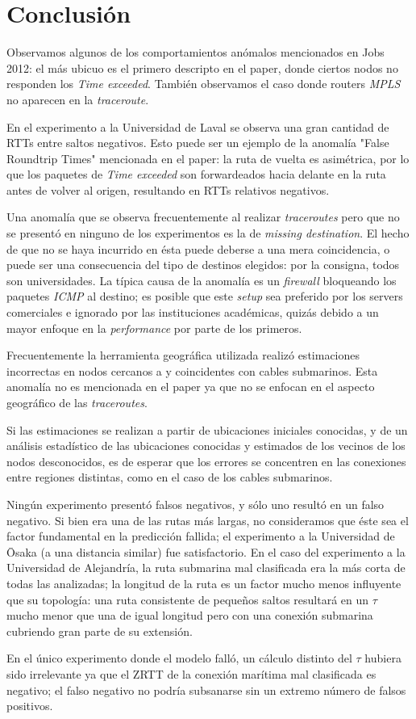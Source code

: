 \section{Conclusión}

\PARstart Observamos algunos de los comportamientos anómalos mencionados en Jobs 2012\cite{anomalias}: el más ubicuo es el primero descripto en el paper, donde ciertos nodos no responden los \textit{Time exceeded}. 
También observamos el caso donde routers \textit{MPLS} no aparecen en la \textit{traceroute}.

\par En el experimento a la Universidad de Laval se observa una gran cantidad de RTTs entre saltos negativos.
Esto puede ser un ejemplo de la anomalía "False Roundtrip Times" mencionada en el paper: la ruta de vuelta es asimétrica, por lo que los paquetes de \textit{Time exceeded} son forwardeados hacia delante en la ruta antes de volver al origen, resultando en RTTs relativos negativos.

\par Una anomalía que se observa frecuentemente al realizar \textit{traceroutes} pero que no se presentó en ninguno de los experimentos es la de \textit{missing destination}.
El hecho de que no se haya incurrido en ésta puede deberse a una mera coincidencia, o puede ser una consecuencia del tipo de destinos elegidos: por la consigna, todos son universidades.
La típica causa de la anomalía es un \textit{firewall} bloqueando los paquetes \textit{ICMP} al destino; es posible que este \textit{setup} sea preferido por los servers comerciales e ignorado por las instituciones académicas, quizás debido a un mayor enfoque en la \textit{performance} por parte de los primeros.

\par Frecuentemente la herramienta geográfica utilizada realizó estimaciones incorrectas en nodos cercanos a y coincidentes con cables submarinos.
Esta anomalía no es mencionada en el paper ya que no se enfocan en el aspecto geográfico de las \textit{traceroutes}.

\par Si las estimaciones se realizan a partir de ubicaciones iniciales conocidas, y de un análisis estadístico de las ubicaciones conocidas y estimados de los vecinos de los nodos desconocidos, es de esperar que los errores se concentren en las conexiones entre regiones distintas, como en el caso de los cables submarinos.

\par Ningún experimento presentó falsos negativos, y sólo uno resultó en un falso negativo.
Si bien era una de las rutas más largas, no consideramos que éste sea el factor fundamental en la predicción fallida; el experimento a la Universidad de \={O}saka (a una distancia similar) fue satisfactorio.
En el caso del experimento a la Universidad de Alejandría, la ruta submarina mal clasificada era la más corta de todas las analizadas; la longitud de la ruta es un factor mucho menos influyente que su topología: una ruta consistente de pequeños saltos resultará en un $\tau$ mucho menor que una de igual longitud pero con una conexión submarina cubriendo gran parte de su extensión.

\par En el único experimento donde el modelo falló, un cálculo distinto del $\tau$ hubiera sido irrelevante ya que el ZRTT de la conexión marítima mal clasificada es negativo; el falso negativo no podría subsanarse sin un extremo número de falsos positivos.
